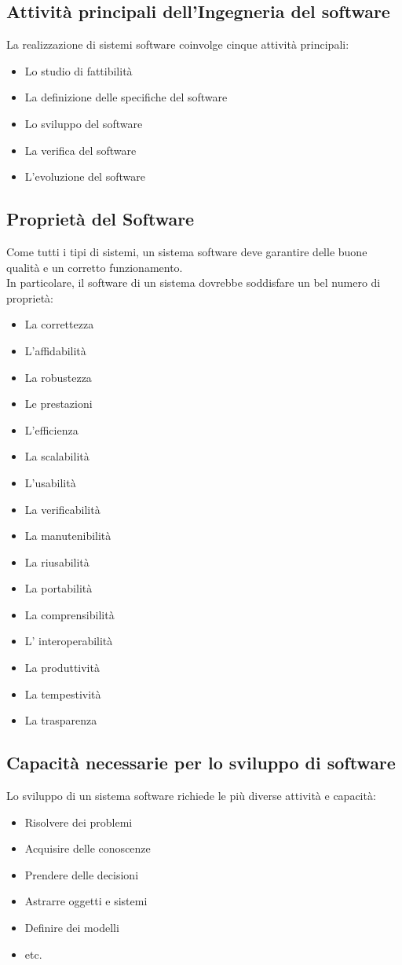 \documentclass{article}
\begin{document}
	\subsection{Attività principali dell’Ingegneria del software}
	La realizzazione di sistemi software coinvolge cinque attività principali:
	\begin{itemize}
		\item Lo studio di fattibilità
		\item La definizione delle specifiche del software 
		\item Lo sviluppo del software
		\item La verifica del software
		\item L’evoluzione del software
	\end{itemize}
	\subsection{Proprietà del Software}
	Come tutti i tipi di sistemi, un sistema software deve garantire delle buone qualità e un corretto funzionamento. \\
	In particolare, il software di un sistema dovrebbe soddisfare un bel numero di proprietà:
	\begin{itemize}
		\item La correttezza
		\item L’affidabilità
		\item La robustezza
		\item Le prestazioni
		\item L’efficienza
		\item La scalabilità
		\item L’usabilità
		\item La verificabilità
		\item La manutenibilità
		\item La riusabilità
		\item La portabilità
		\item La comprensibilità
		\item L’ interoperabilità
		\item La produttività
		\item La tempestività
		\item La trasparenza
	\end{itemize}
	\subsection{Capacità necessarie per lo sviluppo di software}
	Lo sviluppo di un sistema software richiede le più diverse attività e capacità: 
	\begin{itemize}
		\item Risolvere dei problemi
		\item Acquisire delle conoscenze
		\item Prendere delle decisioni
		\item Astrarre oggetti e sistemi
		\item Definire dei modelli
		\item etc.
	\end{itemize}
\end{document}
